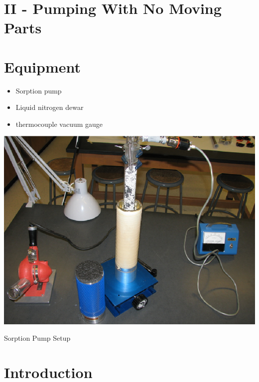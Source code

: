 \section{II - Pumping With No Moving Parts}

\section{Equipment}

\begin{minipage}[t]{0.5\textwidth}
\begin{itemize}[noitemsep]
\item Sorption pump
\item Liquid nitrogen dewar
\end{itemize}
\end{minipage}
\begin{minipage}[t]{0.5\textwidth}
\begin{itemize}[noitemsep]
\item thermocouple vacuum gauge
\end{itemize}
\end{minipage}

\begin{marginfigure}
\includegraphics{Sorption-Pump-Table3.eps}
\caption{Sorption Pump Setup}
\label{fig:VACsetup2}
\end{marginfigure}

\section{Introduction}


